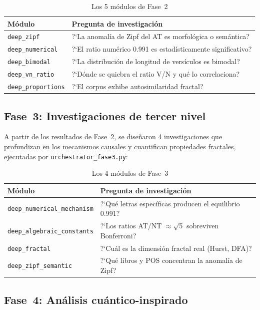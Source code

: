 \documentclass[12pt,a4paper]{article}
\begin{document}
\begin{table}[H]
\centering
\caption{Los 5 m\'odulos de Fase~2}
\begin{tabular}{lp{9cm}}
\toprule
\textbf{M\'odulo} & \textbf{Pregunta de investigaci\'on} \\
\midrule
\texttt{deep\_zipf}        & ?`La anomal\'ia de Zipf del AT es morfol\'ogica o sem\'antica? \\
\texttt{deep\_numerical}   & ?`El ratio num\'erico 0.991 es estad\'isticamente significativo? \\
\texttt{deep\_bimodal}     & ?`La distribuci\'on de longitud de vers\'iculos es bimodal? \\
\texttt{deep\_vn\_ratio}   & ?`D\'onde se quiebra el ratio V/N y qu\'e lo correlaciona? \\
\texttt{deep\_proportions} & ?`El corpus exhibe autosimilaridad fractal? \\
\bottomrule
\end{tabular}
\end{table}

\subsection{Fase~3: Investigaciones de tercer nivel}

A partir de los resultados de Fase~2, se dise\~naron 4 investigaciones
que profundizan en los mecanismos causales y cuantifican propiedades
fractales, ejecutadas por \texttt{orchestrator\_fase3.py}:

\begin{table}[H]
\centering
\caption{Los 4 m\'odulos de Fase~3}
\begin{tabular}{lp{9cm}}
\toprule
\textbf{M\'odulo} & \textbf{Pregunta de investigaci\'on} \\
\midrule
\texttt{deep\_numerical\_mechanism} & ?`Qu\'e letras espec\'ificas producen el equilibrio 0.991? \\
\texttt{deep\_algebraic\_constants} & ?`Los ratios AT/NT $\approx \sqrt{5}$ sobreviven Bonferroni? \\
\texttt{deep\_fractal}             & ?`Cu\'al es la dimensi\'on fractal real (Hurst, DFA)? \\
\texttt{deep\_zipf\_semantic}      & ?`Qu\'e libros y POS concentran la anomal\'ia de Zipf? \\
\bottomrule
\end{tabular}
\end{table}

\subsection{Fase~4: An\'alisis cu\'antico-inspirado}
\end{document}
